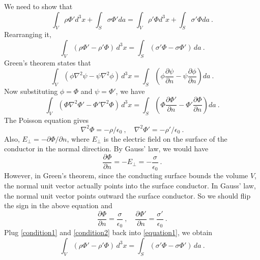 \documentclass[12pt]{article}
\begin{document}
\newpage
{} We need to show that
\begin{equation}
    \int_V \rho \Phi' d^3x + \int_S \sigma \Phi' da = \int_V \rho' \Phi d^3x + \int_S \sigma' \Phi da~.
\end{equation}
Rearranging it,
\begin{equation}
    \int_V(\rho \Phi' - \rho' \Phi) \, d^3x = \int_S(\sigma' \Phi - \sigma \Phi') \, da~.
\end{equation}
Green's theorem states that
\begin{equation}
    \int_V ( \phi \nabla^2 \psi - \psi \nabla^2 \phi )\, d^3x = \int_S \left(\phi \frac{\partial \psi}{\partial n} - \psi \frac{\partial \phi}{\partial n} \right) da~.
\end{equation}
Now substituting $\phi = \Phi$ and $\psi = \Phi'$, we have
\begin{equation}\label{equation1}
    \int_V (\Phi \nabla^2 \Phi' - \Phi' \nabla^2 \Phi)\, d^3x = \int_S \left( \Phi \frac{\partial \Phi'}{\partial n} - \Phi' \frac{\partial \Phi}{\partial n} \right) da~.
\end{equation}
The Poisson equation gives
\begin{equation}\label{condition1}
    \nabla^2 \Phi = - \rho / \epsilon_0~, \quad \nabla^2 \Phi' = - \rho' / \epsilon_0~.
\end{equation}
Also, $E_\perp = - \partial \Phi/ \partial n$, where $E_\perp$ is the electric field on the surface of the conductor in the normal direction. By Gauss' law, we would have
\begin{equation}
    \frac{\partial \Phi}{\partial n} = - E_\perp = - \frac{\sigma}{\epsilon_0}~.
\end{equation}
However, in Green's theorem, since the conducting surface bounds the volume $V$, the normal unit vector actually points into the surface conductor. In Gauss' law, the normal unit vector points outward the surface conductor. So we should flip the sign in the above equation and
\begin{equation}\label{condition2}
    \frac{\partial \Phi}{\partial n} = \frac{\sigma}{\epsilon_0}~,\quad \frac{\partial \Phi'}{\partial n} = \frac{\sigma'}{\epsilon_0}~.
\end{equation}
Plug \eqref{condition1} and \eqref{condition2} back into \eqref{equation1}, we obtain
\begin{equation}
    \int_V (\rho \Phi' - \rho' \Phi)\, d^3 x = \int_S ( \sigma' \Phi - \sigma \Phi' )\, da~.
\end{equation}
\end{document}
